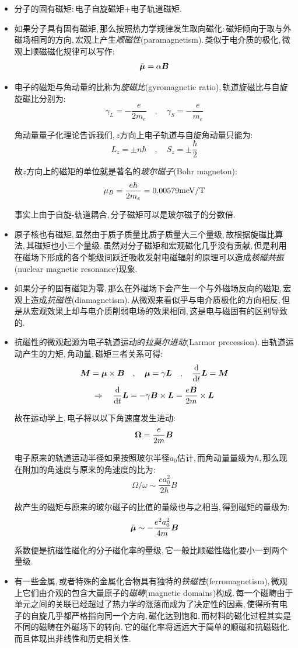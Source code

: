 \begin{itemize}
\item 分子的固有磁矩:\,电子自旋磁矩+电子轨道磁矩.
\item 如果分子具有固有磁矩,\,那么按照热力学规律发生取向磁化:\,磁矩倾向于取与外磁场相同的方向,\,宏观上产生\emph{顺磁性}(paramagnetism).\,类似于电介质的极化,\,微观上顺磁磁化规律可以写作:
\[\bar{\boldsymbol{\mu}}=\alpha \boldsymbol{B}\]
\item 电子的磁矩与角动量的比称为\emph{旋磁比}(gyromagnetic ratio),\,轨道旋磁比与自旋旋磁比分别为:
\[\gamma_L=-\frac{e}{2m_e}\quad ,\quad \gamma_S=-\frac{e}{m_e}\]

角动量量子化理论告诉我们,\,$z$方向上电子轨道与自旋角动量只能为:
\[L_z=\pm n\hbar \quad ,\quad  S_z=\pm \frac{\hbar}{2}\]

故$z$方向上的磁矩的单位就是著名的\emph{玻尔磁子}(Bohr magneton):
\[\mu_B=\frac{e\hbar}{2m_e}=0.00579{\rm meV/T}\]

事实上由于自旋-轨道耦合,\,分子磁矩可以是玻尔磁子的分数倍.

\item 原子核也有磁矩,\,显然由于质子质量比质子质量大三个量级,\,故根据旋磁比算法,\,其磁矩也小三个量级.\,虽然对分子磁矩和宏观磁化几乎没有贡献,\,但是利用在磁场下形成的各个能级间跃迁吸收发射电磁辐射的原理可以造成\emph{核磁共振}(nuclear magnetic resonance)现象.

\item 如果分子的固有磁矩为零,\,那么在外磁场下会产生一个与外磁场反向的磁矩,\,宏观上造成\emph{抗磁性}(diamagnetism).\,从微观来看似乎与电介质极化的方向相反,\,但是从宏观效果上却与电介质削弱电场的效果相同,\,这是电与磁固有的区别导致的.

\item 抗磁性的微观起源为电子轨道运动的\emph{拉莫尔进动}(Larmor precession).\,由轨道运动产生的力矩,\,角动量,\,磁矩三者关系可得:
\[\boldsymbol{M}=\boldsymbol{\mu}\times \boldsymbol{B}\quad ,\quad  \boldsymbol{\mu}=\gamma \boldsymbol{L}\quad ,\quad  \frac{\textrm{d}}{\textrm{d} t}\boldsymbol{L}=\boldsymbol{M}\]
\[\Rightarrow \quad  \frac{\textrm{d}}{\textrm{d} t}\boldsymbol{L}=-\gamma \boldsymbol{B}\times \boldsymbol{L}=\frac{e\boldsymbol{B}}{2m}\times \boldsymbol{L}\]

故在运动学上,\,电子将以以下角速度发生进动:
\[\boldsymbol{\Omega}=\frac{e}{2m}\boldsymbol{B}\]

电子原来的轨道运动半径如果按照玻尔半径$a_0$估计,\,而角动量量级为$\hbar$,\,那么现在附加的角速度与原来的角速度的比为:
\[\Omega/\omega\sim\frac{ea_0^2}{2\hbar}B\]

故产生的磁矩与原来的玻尔磁子的比值的量级也与之相当,\,得到磁矩的量级为:
\[\bar{\boldsymbol{\mu}}\sim-\frac{e^2a_0^2	}{4m}\boldsymbol{B}\]

系数便是抗磁性磁化的分子磁化率的量级,\,它一般比顺磁性磁化要小一到两个量级.

\item 有一些金属,\,或者特殊的金属化合物具有独特的\emph{铁磁性}(ferromagnetism),\,微观上它们由介观的包含大量原子的\emph{磁畴}(magnetic domains)构成.\,每一个磁畴由于单元之间的关联已经超过了热力学的涨落而成为了决定性的因素,\,使得所有电子的自旋几乎都严格指向同一个方向,\,磁化达到饱和.\,而材料的磁化过程其实是不同的磁畴在外磁场下的转向.\,它的磁化率将远远大于简单的顺磁和抗磁磁化.\,而且体现出非线性和历史相关性.


\end{itemize}

